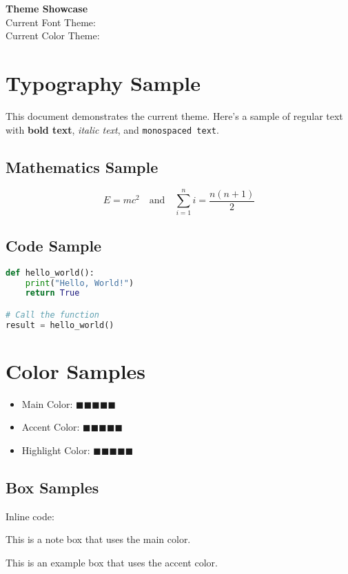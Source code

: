 \documentclass[a4paper,11pt]{article}
\begin{document}
\begin{center}
    \Large\textbf{Theme Showcase}\\[0.5cm]
    \large Current Font Theme: \textbf{\textcolor{accentcolor}{\fonttheme}}\\
    Current Color Theme: \textbf{\textcolor{maincolor}{\activetheme}}
\end{center}

\section{Typography Sample}

This document demonstrates the current theme. Here's a sample of regular text with \textbf{bold text}, \textit{italic text}, and \texttt{monospaced text}.

\subsection{Mathematics Sample}
$$E = mc^2 \quad \text{and} \quad \sum_{i=1}^{n} i = \frac{n(n+1)}{2}$$

\subsection{Code Sample}
\begin{lstlisting}[language=Python]
def hello_world():
    print("Hello, World!")
    return True

# Call the function
result = hello_world()
\end{lstlisting}

\section{Color Samples}

\begin{itemize}
    \item Main Color: \textcolor{maincolor}{$\blacksquare\blacksquare\blacksquare\blacksquare\blacksquare$}
    \item Accent Color: \textcolor{accentcolor}{$\blacksquare\blacksquare\blacksquare\blacksquare\blacksquare$}
    \item Highlight Color: \textcolor{highlightcolor}{$\blacksquare\blacksquare\blacksquare\blacksquare\blacksquare$}
\end{itemize}

\subsection{Box Samples}

Inline code: 

\begin{notetbox}
This is a note box that uses the main color.
\end{notetbox}

\begin{exampletbox}
This is an example box that uses the accent color.
\end{exampletbox}
\end{document}
